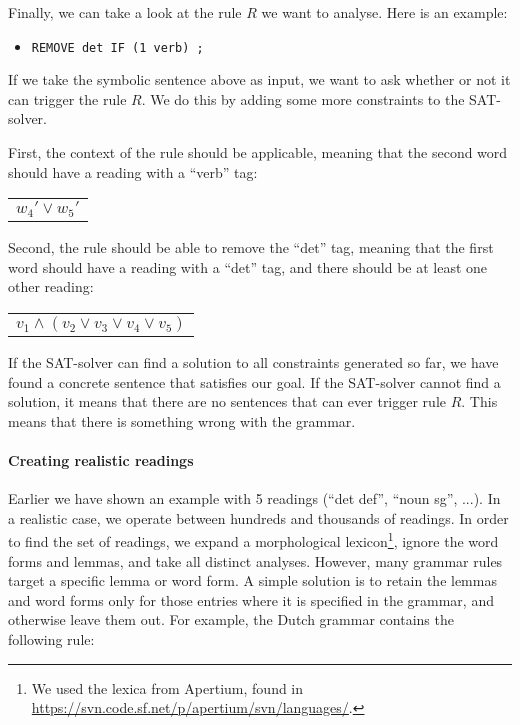 Finally, we can take a look at the rule $R$ we want to analyse. Here is an example:
\begin{itemize}
\item[] \texttt{REMOVE det IF (1 verb) ;}
\end{itemize}
If we take the symbolic sentence above as input, we want to ask whether or not it can trigger the rule $R$. We do this by adding some more constraints to the SAT-solver.

First, the context of the rule should be applicable, meaning that the second word should have a reading with a ``verb'' tag:
\begin{center}
\begin{tabular}{c}
$w_4' \vee w_5'$
\end{tabular}
\end{center}
Second, the rule should be able to remove the ``det'' tag, meaning that the first word should have a reading with a ``det'' tag, and there should be at least one other reading:
\begin{center}
\begin{tabular}{c}
$v_1 \wedge (v_2 \vee v_3 \vee v_4 \vee v_5)$
\end{tabular}
\end{center}
If the SAT-solver can find a solution to all constraints generated so far, we have found a concrete sentence that satisfies our goal. If the SAT-solver cannot find a solution, it means that there are no sentences that can ever trigger rule $R$. This means that there is something wrong with the grammar.


\paragraph{Creating realistic readings}

Earlier we have shown an example with 5 readings (``det def'', ``noun sg'', ...). In a realistic case, we operate between hundreds and thousands of readings. 
In order to find the set of readings, we expand a morphological lexicon\footnote{We used the lexica from Apertium, found in \url{https://svn.code.sf.net/p/apertium/svn/languages/}.}, ignore the word forms and lemmas, and take all distinct analyses. 
However, many grammar rules target a specific lemma or word form.
A simple solution is to retain the lemmas and word forms only for those entries where it is specified in the grammar, and otherwise leave them out. For example, the Dutch grammar contains the following rule:


